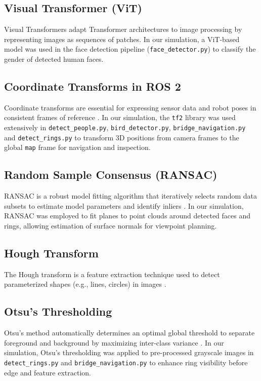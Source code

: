 \documentclass[a4paper]{article}
\begin{document}
\subsection{Visual Transformer (ViT)}
Visual Transformers \cite{vistra} adapt Transformer architectures to image processing by representing images as sequences of patches. In our simulation, a ViT-based model was used in the face detection pipeline (\texttt{face\_detector.py}) to classify the gender of detected human faces.

\subsection{Coordinate Transforms in ROS 2}
Coordinate transforms are essential for expressing sensor data and robot poses in consistent frames of reference \cite{foote2013tf}. In our simulation, the \texttt{tf2} library was used extensively in \texttt{detect\_people.py}, \texttt{bird\_detector.py}, \texttt{bridge\_navigation.py} and \texttt{detect\_rings.py} to transform 3D positions from camera frames to the global \texttt{map} frame for navigation and inspection.

\subsection{Random Sample Consensus (RANSAC)}
RANSAC is a robust model fitting algorithm that iteratively selects random data subsets to estimate model parameters and identify inliers \cite{fischler1981random}. In our simulation, RANSAC was employed to fit planes to point clouds around detected faces and rings, allowing estimation of surface normals for viewpoint planning.

\subsection{Hough Transform}
The Hough transform is a feature extraction technique used to detect parameterized shapes (e.g., lines, circles) in images \cite{duda1972use}. 

\subsection{Otsu's Thresholding}
Otsu's method automatically determines an optimal global threshold to separate foreground and background by maximizing inter-class variance \cite{otsu1979threshold}. In our simulation, Otsu's thresholding was applied to pre-processed grayscale images in \texttt{detect\_rings.py} and \texttt{bridge\_navigation.py} to enhance ring visibility before edge and feature extraction.
\end{document}

